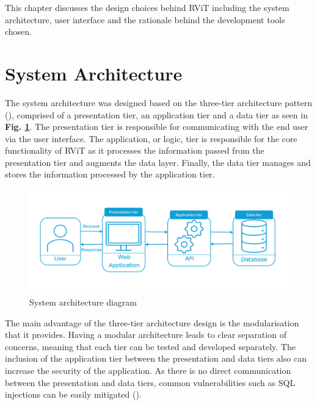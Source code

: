 \documentclass[l4proj.tex]{subfiles}
\begin{document}
    

This chapter discusses the design choices behind RViT including the system architecture, user interface and the rationale behind the development tools chosen. 

\section{System Architecture}

The system architecture was designed based on the three-tier architecture pattern (\cite{IBM3Tier}), comprised of a presentation tier, an application tier and a data tier as seen in \textbf{Fig. \ref{fig:achitecture pattern}}. The presentation tier is responsible for communicating with the end user via the user interface. The application, or logic, tier is responsible for the core functionality of RViT as it processes the information passed from the presentation tier and augments the data layer. Finally, the data tier manages and stores the information processed by the application tier.

\begin{figure}[h!]
\begin{center}
\includegraphics[scale=0.6]{dissertation/images/System Architecture.png}
\caption{System architecture diagram}
\label{fig:achitecture pattern} 
\end{center}
\end{figure}

The main advantage of the three-tier architecture design is the modularisation that it provides. Having a modular architecture leads to clear separation of concerns, meaning that each tier can be tested and developed separately. The inclusion of the application tier between the presentation and data tiers also can increase the security of the application. As there is no direct communication between the presentation and data tiers, common vulnerabilities such as SQL injections can be easily mitigated (\cite{IBM3Tier}).
\end{document}
